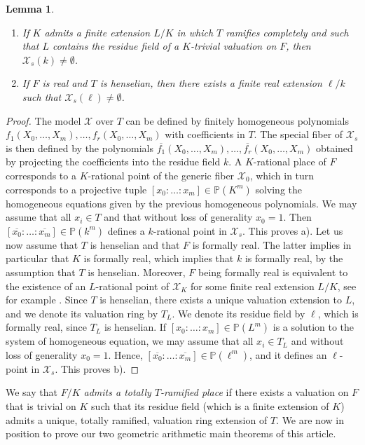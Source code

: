 \documentclass[a4paper,12pt,reqno]{amsart}
\newcommand\mc\mathcal
\newtheorem{lem}[thm]{Lemma}
\theoremstyle{definition}
\numberwithin{equation}{thm}
\begin{document}
\begin{lem}\label{rational and real specialization}
    \begin{enumerate}
    \item[a)] If $K$ admits a finite extension $L/K$ in which $T$ ramifies completely and such that $L$ contains the residue field of  a $K$-trivial valuation on $F$, then $\mc{X}_s(k) \neq \emptyset$.
    \item[b)] If $F$ is real and $T$ is henselian, then there exists a finite real extension $\ell/k$ such that $\mc{X}_s(\ell) \neq \emptyset$.
    \end{enumerate}
\end{lem}
\begin{proof}
The model $\mc{X}$ over $T$ can be defined by finitely homogeneous polynomials $f_1(X_0,\ldots,X_m), \ldots, f_r(X_0,\ldots,X_m)$ with coefficients in $T$. The special fiber of $\mc{X}_s$ is then defined by the polynomials
$\overline{f_1}(X_0,\ldots,X_m), \ldots, \overline{f_r}(X_0,\ldots,X_m)$ obtained by projecting the coefficients into the residue field $k$.
A $K$-rational place of $F$ corresponds to a $K$-rational point of the generic fiber $\mc{X}_0$, which in turn corresponds to a projective tuple $[x_0:\ldots :x_m] \in \mathbb{P}(K^m)$ solving the homogeneous equations given by the previous homogeneous polynomials. We may assume that all $x_i \in T$ and that without loss of generality $x_0=1$. Then $[\overline{x_0}:\ldots :\overline{x_m}] \in \mathbb{P}(k^m)$ defines a $k$-rational point in $\mc{X}_s$. This proves a).
Let us now assume  that $T$ is henselian and that $F$ is formally real. The latter implies in particular that $K$ is formally real, which implies that $k$ is formally real, by the assumption that $T$ is henselian. Moreover, $F$ being formally real is equivalent to the existence of an $L$-rational point of $\mc{X}_K$ for some finite real extension $L/K$, see for example \cite[Proposition 2.3]{G15}.
Since $T$ is henselian, there exists a unique valuation extension to $L$, and we denote its valuation ring by $T_L$. We denote its residue field by $\ell$, which is formally real, since $T_L$ is henselian.
If $[x_0:\ldots :x_m] \in \mathbb{P}(L^m)$ is a solution to the system of homogeneous equation, we may assume that all $x_i \in T_L$ and without loss of generality $x_0=1$. Hence, $[\overline{x_0}:\ldots :\overline{x_m}] \in \mathbb{P}(\ell^m)$, and it defines an $\ell$-point in $\mc{X}_s$. This proves b).
\end{proof}

We say that \textit{$F/K$ admits a totally $T$-ramified place} if there exists a valuation on $F$ that is trivial on $K$ such that its residue field (which is a finite extension of $K$) admits a unique, totally ramified, valuation ring extension of $T$. We are now in position to prove our two geometric arithmetic main theorems of this article.
\end{document}
